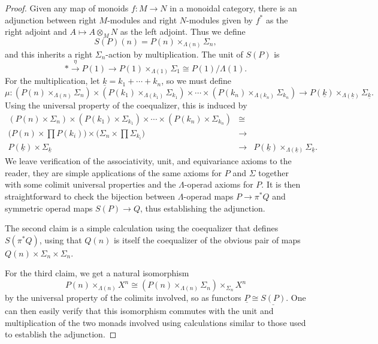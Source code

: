\documentclass{amsbook} %
\numberwithin{section}{chapter}
\begin{document}
\begin{proof}
Given any map of monoids $f:M \to N$ in a monoidal category, there is an adjunction between right $M$-modules and right $N$-modules given by $f^{*}$ as the right adjoint and $A \mapsto A \otimes_{M} N$ as the left adjoint.  Thus we define \[
S(P)(n) = P(n) \times_{\Lambda(n)} \Sigma_{n},
\]
and this inherits a right $\Sigma_{n}$-action by multiplication.  The unit of $S(P)$ is
\[
* \stackrel{\eta}{\longrightarrow} P(1) \longrightarrow P(1)\times_{\Lambda(1)}\Sigma_{1} \cong P(1)/\Lambda(1).
\]
For the multiplication, let $\underline{k} = k_1 + \cdots + k_n$, so we must define
\[
\mu: (P(n) \times_{\Lambda(n)} \Sigma_{n}) \times (P(k_1) \times_{\Lambda(k_1)} \Sigma_{k_1}) \times \cdots \times (P(k_n) \times_{\Lambda(k_n)} \Sigma_{k_n}) \to P(\underline{k}) \times_{\Lambda(\underline{k})} \Sigma_{\underline{k}}.
\]
Using the universal property of the coequalizer, this is induced by
\[
\begin{array}{rcl}
(P(n) \times \Sigma_{n}) \times (P(k_1) \times \Sigma_{k_1}) \times \cdots \times (P(k_n) \times \Sigma_{k_n}) & \cong & \\
 \Big(P(n) \times \prod P(k_{i}) \Big) \times \Big(\Sigma_{n} \times \prod \Sigma_{k_{i}} \Big) & \to &\\
   P(\underline{k}) \times \Sigma_{\underline{k}} & \to &  P(\underline{k}) \times_{\Lambda(\underline{k})} \Sigma_{\underline{k}}.
   \end{array}
\]
We leave verification of the associativity, unit, and equivariance axioms to the reader, they are simple applications of the same axioms for $P$ and $\Sigma$ together with some colimit universal properties and the $\Lambda$-operad axioms for $P$.  It is then straightforward to check the bijection between $\Lambda$-operad maps $P \to \pi^{*}Q$ and symmetric operad maps $S(P) \to Q$, thus establishing the adjunction.

The second claim is a simple calculation using the coequalizer that defines $S(\pi^{*}Q)$, using that $Q(n)$ is itself the coequalizer of the obvious pair of maps $Q(n) \times \Sigma_{n} \times \Sigma_{n}$.

For the third claim, we get a natural isomorphism
\[
P(n) \times_{\Lambda(n)}X^{n} \cong (P(n) \times_{\Lambda(n)} \Sigma_{n}) \times_{\Sigma_{n}} X^{n}
\]
by the universal property of the colimits involved, so as functors $\underline{P} \cong \underline{S(P)}$.  One can then easily verify that this isomorphism commutes with the unit and multiplication of the two monads involved using calculations similar to those used to establish the adjunction.
\end{proof}
\end{document}
